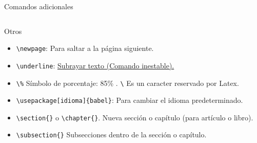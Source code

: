 \documentclass[aspectratio=169, 10pt]{beamer}
\begin{document}
\begin{frame}[fragile]{Comandos adicionales}
    \begin{columns}
        \begin{column}{.65\linewidth}    
            \begin{block}{Otros}
            \begin{itemize} \pause
                \item \verb|\newpage|: Para saltar a la página siguiente. \pause
                \item  \verb|\underline|: \underline{Subrayar texto (Comando inestable).} \pause
                \item \verb|\%| Símbolo de porcentaje: 85\% . \verb|\| Es un caracter reservado por Latex. \pause
                \item \verb|\usepackage[idioma]{babel}|: Para cambiar el idioma predeterminado. \pause
                \item \verb|\section{}| o \verb|\chapter{}|. Nueva sección o capítulo (para artículo o libro). \pause
                \item \verb|\subsection{}| Subsecciones dentro de la sección o capítulo.
            \end{itemize}
            \end{block} 
        \end{column}    
    \end{columns}
\end{frame}
\end{document}
